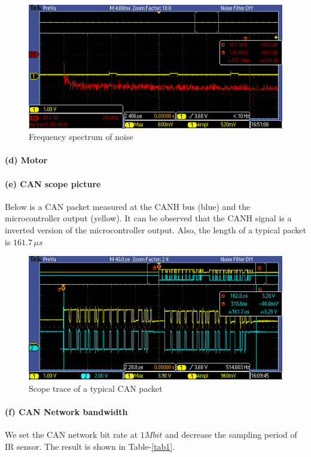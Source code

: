 \documentclass[a4paper]{article}
\newlength{\pic}
\begin{document}
\setlength{\pic}{0.8\textwidth}
\begin{figure}[htp]
\center
\includegraphics[width=\pic]{scope/ir_fft}
\caption{Frequency spectrum of noise}
\label{noise}
\end{figure}


\paragraph{(d) Motor}
\paragraph{(e) CAN scope picture} Below is a CAN packet measured at the CANH bus (blue) and the microcontroller output (yellow). It can be observed that the CANH signal is a inverted version of the microcontroller output. Also, the length of
a typical packet is $ 161.7 \, \mu s $

\setlength{\pic}{0.8\textwidth}
\begin{figure}[htp]
\center
\includegraphics[width=\pic]{scope/CAN_packet}
\caption{Scope trace of a typical CAN packet}
\label{trace}
\end{figure}


\paragraph{(f) CAN Network bandwidth} We set the CAN network bit rate at $ 1 Mbit $ and decrease the sampling period of
IR sensor. The result is shown in Table-\ref{tab1}.
\end{document}
